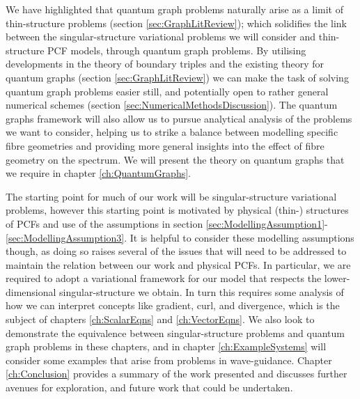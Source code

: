 We have highlighted that quantum graph problems naturally arise as a limit of thin-structure problems (section \ref{sec:GraphLitReview}); which solidifies the link between the singular-structure variational problems we will consider and thin-structure PCF models, through quantum graph problems.
By utilising developments in the theory of boundary triples and the existing theory for quantum graphs (section \ref{sec:GraphLitReview}) we can make the task of solving quantum graph problems easier still, and potentially open to rather general numerical schemes (section \ref{sec:NumericalMethodsDiscussion}).
The quantum graphs framework will also allow us to pursue analytical analysis of the problems we want to consider, helping us to strike a balance between modelling specific fibre geometries and providing more general insights into the effect of fibre geometry on the spectrum.
We will present the theory on quantum graphs that we require in chapter \ref{ch:QuantumGraphs}. \newline

The starting point for much of our work will be singular-structure variational problems, however this starting point is motivated by physical (thin-) structures of PCFs and use of the assumptions in section \ref{sec:ModellingAssumption1}-\ref{sec:ModellingAssumption3}.
It is helpful to consider these modelling assumptions though, as doing so raises several of the issues that will need to be addressed to maintain the relation between our work and physical PCFs.
In particular, we are required to adopt a variational framework for our model that respects the lower-dimensional singular-structure we obtain. 
In turn this requires some analysis of how we can interpret concepts like gradient, curl, and divergence, which is the subject of chapters \ref{ch:ScalarEqns} and \ref{ch:VectorEqns}.
We also look to demonstrate the equivalence between singular-structure problems and quantum graph problems in these chapters, and in chapter \ref{ch:ExampleSystems} will consider some examples that arise from problems in wave-guidance. 
Chapter \ref{ch:Conclusion} provides a summary of the work presented and discusses further avenues for exploration, and future work that could be undertaken.